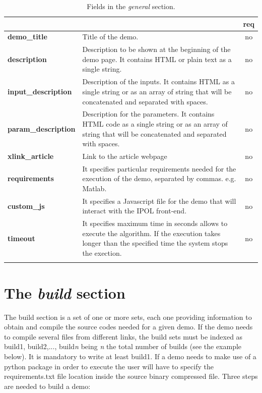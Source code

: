 % 
\begin{longtable}{|>{\bf}L{\linewidth}|L{\linewidth}|c|}
\hline
      &  & {\bf req} 
\tabularnewline \hline \hline
 demo\_title         & Title of the demo. & no\\ \hline
 description         & Description to be shown at the beginning of the demo page. It contains HTML or plain text as a single string. & no \\ \hline
 input\_description  & Description of the inputs. It contains HTML as a single string or as an array of string that will be concatenated and separated with spaces. & no \\ \hline
 param\_description  & Description for the parameters. It contains HTML code as a single string or as an array of string that will be concatenated and separated with spaces. & no
\\ \hline
 xlink\_article     & Link to the article webpage & no  \\ \hline
 requirements 	    & It specifies particular requirements needed for the execution of the demo, separated by commas. e.g. Matlab. & no \\ \hline
 custom\_js 	    & It specifies a Javascript file for the demo that will interact with the IPOL front-end. & no \\ \hline
 timeout 	    & It specifies maximum time in seconds allows to execute the algorithm. If the execution takes longer than the specified time the system stops the exection. & no \\ \hline
\caption{Fields in the \emph{general} section.}
\end{longtable}

\section{The \emph{build} section}

The build section is a set of one or more sets, each one providing information to obtain and compile the source codes needed for a given demo. If the demo needs to compile several files from different links, the build sets must be indexed as build1, build2,..., build\textit{n} being \textit{n} the total number of builds (see the example below). It is mandatory to write at least build1. If a demo needs to make use of a python package in order to execute the user will have to specify the requirements.txt file location inside the source binary compressed file. Three steps are needed to build a demo: 

